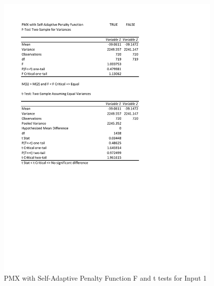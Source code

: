 \documentclass[times]{article}
\begin{document}
	\begin{figure}
		\caption{PMX with Self-Adaptive Penalty Function F and t tests for Input 1}
		\label{fig:pmx_sa_penalty1}
		\includegraphics[width=\textwidth]{./t_test/pmx_sa_penalty1}
	\end{figure}
\end{document}
